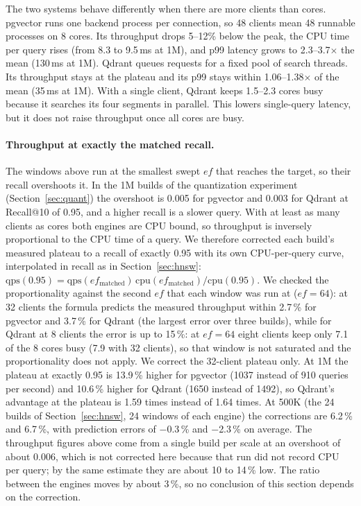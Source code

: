 \documentclass[sigconf, nonacm]{acmart}
\begin{document}
The two systems behave differently when there are more clients than cores. pgvector
runs one backend process per connection, so 48 clients mean 48 runnable processes on
8 cores. Its throughput drops 5--12\% below the peak, the CPU time per query rises (from
8.3 to 9.5\,ms at 1M), and p99 latency grows to 2.3--3.7$\times$ the mean (130\,ms at
1M). Qdrant queues requests for a fixed pool of search threads. Its throughput stays at
the plateau and its p99 stays within 1.06--1.38$\times$ of the mean (35\,ms at 1M). With
a single client, Qdrant keeps 1.5--2.3 cores busy because it searches its four segments
in parallel. This lowers single-query latency, but it does not raise throughput once all
cores are busy.

\paragraph{Throughput at exactly the matched recall.} The windows above run at the smallest swept $ef$ that reaches the target, so
their recall overshoots it. In the 1M builds of the quantization experiment (Section~\ref{sec:quant}) the overshoot is 0.005 for pgvector and
0.003 for Qdrant at Recall@10 of 0.95, and a higher recall is a slower query. With at least as many clients as cores both engines are CPU bound,
so throughput is inversely proportional to the CPU time of a query. We therefore corrected each build's measured plateau to a recall of exactly 0.95
with its own CPU-per-query curve, interpolated in recall as in Section~\ref{sec:hnsw}:
$\mathrm{qps}(0.95)=\mathrm{qps}(ef_{\mathrm{matched}})\,\mathrm{cpu}(ef_{\mathrm{matched}})/\mathrm{cpu}(0.95)$.
We checked the proportionality against the second $ef$ that each window was run at ($ef=64$): at 32 clients the formula predicts the measured throughput
within 2.7\,\% for pgvector and 3.7\,\% for Qdrant (the largest error over three builds), while for Qdrant at 8 clients the error is up to 15\,\%: at $ef=64$ eight clients keep only 7.1 of the 8 cores busy (7.9 with 32 clients), so that window is not
saturated and the proportionality does not apply. We correct the 32-client plateau only. At 1M the plateau at exactly 0.95 is 13.9\,\% higher for pgvector (1037 instead of 910 queries per
second) and 10.6\,\% higher for Qdrant (1650 instead of 1492), so Qdrant's advantage at the plateau is 1.59 times instead of 1.64 times. At 500K (the 24 builds of
Section~\ref{sec:hnsw}, 24 windows of each engine) the corrections are 6.2\,\% and 6.7\,\%, with prediction errors of $-$0.3\,\% and $-$2.3\,\% on average. The throughput figures above
come from a single build per scale at an overshoot of about 0.006, which is not corrected here because that run did not record CPU per query; by the same
estimate they are about 10 to 14\,\% low. The ratio between the engines moves by about 3\,\%, so no conclusion of this section depends on the correction.
\end{document}
